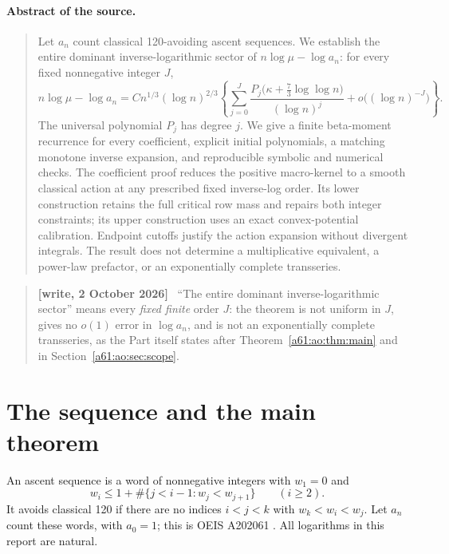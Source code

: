 \documentclass[11pt,letterpaper]{article}
\numberwithin{equation}{section}
\theoremstyle{remark}\newtheorem{remark}[theorem]{Remark}
\newenvironment{writenote}{\par\smallskip\begin{quote}\small\textbf{[write, 2 October 2026]}\ }{\end{quote}\smallskip}
\begin{document}
\paragraph{Abstract of the source.}
\begin{quote}\small
Let $a_n$ count classical 120-avoiding ascent sequences. We establish the
entire dominant inverse-logarithmic sector of $n\log\mu-\log a_n$:
for every fixed nonnegative integer $J$,
\[
 n\log\mu-\log a_n
 =Cn^{1/3}(\log n)^{2/3}
 \left\{\sum_{j=0}^{J}
 \frac{P_j\bigl(\kappa+\frac73\log\log n\bigr)}{(\log n)^j}
 +o\bigl((\log n)^{-J}\bigr)\right\}.
\]
The universal polynomial $P_j$ has degree $j$. We give a finite
beta-moment recurrence for every coefficient, explicit initial
polynomials, a matching monotone inverse expansion, and reproducible
symbolic and numerical checks. The coefficient proof reduces the
positive macro-kernel to a smooth classical action at any prescribed
fixed inverse-log order. Its lower construction retains the full
critical row mass and repairs both integer constraints; its upper
construction uses an exact convex-potential calibration. Endpoint
cutoffs justify the action expansion without divergent integrals.
The result does not determine a multiplicative equivalent, a
power-law prefactor, or an exponentially complete transseries.
\end{quote}

\begin{writenote}
``The entire dominant inverse-logarithmic sector'' means every \emph{fixed finite} order $J$: the theorem is not uniform in $J$, gives no $o(1)$ error in $\log a_n$, and is not an exponentially complete transseries, as the Part itself states after Theorem~\ref{a61:ao:thm:main} and in Section~\ref{a61:ao:sec:scope}.
\end{writenote}


\section{The sequence and the main theorem}
An ascent sequence is a word of nonnegative integers with $w_1=0$ and
\[
 w_i\le 1+\#\{j<i-1:w_j<w_{j+1}\}\qquad(i\ge2).
\]
It avoids classical 120 if there are no indices $i<j<k$ with
$w_k<w_i<w_j$. Let $a_n$ count these words, with $a_0=1$; this is
OEIS A202061 \cite{OEIS}. All logarithms in this report are natural.
\end{document}
